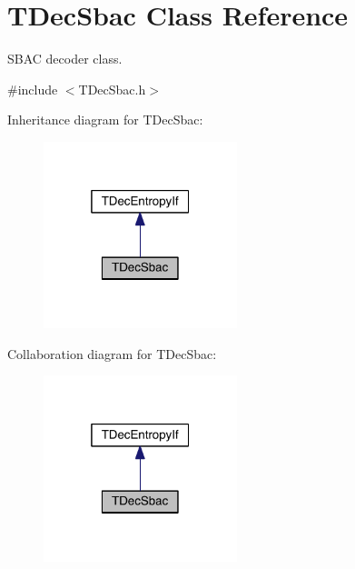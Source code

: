 \hypertarget{class_t_dec_sbac}{}\section{T\+Dec\+Sbac Class Reference}
\label{class_t_dec_sbac}


S\+B\+AC decoder class.  




{\ttfamily \#include $<$T\+Dec\+Sbac.\+h$>$}



Inheritance diagram for T\+Dec\+Sbac\+:
\nopagebreak
\begin{figure}[H]
\begin{center}
\leavevmode
\includegraphics[width=160pt]{d9/d2a/class_t_dec_sbac__inherit__graph}
\end{center}
\end{figure}


Collaboration diagram for T\+Dec\+Sbac\+:
\nopagebreak
\begin{figure}[H]
\begin{center}
\leavevmode
\includegraphics[width=160pt]{dc/d54/class_t_dec_sbac__coll__graph}
\end{center}
\end{figure}
